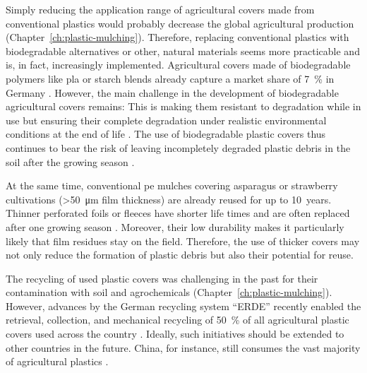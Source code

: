 Simply reducing the application range of agricultural covers made from conventional plastics would probably decrease the global agricultural production (Chapter~\ref{ch:plastic-mulching}). Therefore, replacing conventional plastics with biodegradable alternatives or other, natural materials seems more practicable \citep{BrandesMikro2020} and is, in fact, increasingly implemented. Agricultural covers made of biodegradable polymers like \ac{pla} or starch blends already capture a market share of \SI{7}{\percent} in Germany \citep{BertlingKunststoffe2021}. However, the main challenge in the development of biodegradable agricultural covers remains: This is making them resistant to degradation while in use but ensuring their complete degradation under realistic environmental conditions at the end of life \citep[Chapter~\ref{ch:plastic-mulching};][]{BertlingKunststoffe2021}. The use of biodegradable plastic covers thus continues to bear the risk of leaving incompletely degraded plastic debris in the soil after the growing season \citep{SanderBiodegradation2019,VieraAre2021}.

At the same time, conventional \ac{pe} mulches covering asparagus or strawberry cultivations (\SI{>50}{\micro\meter} film thickness) are already reused for up to \SI{10}{years}. Thinner perforated foils or fleeces have shorter life times and are often replaced after one growing season \citep[Chapter~\ref{ch:screening};][]{BertlingKunststoffe2021}. Moreover, their low durability makes it particularly likely that film residues stay on the field. Therefore, the use of thicker covers may not only reduce the formation of plastic debris but also their potential for reuse.

The recycling of used plastic covers was challenging in the past for their contamination with soil and agrochemicals (Chapter~\ref{ch:plastic-mulching}). However, advances by the German recycling system ``ERDE'' recently enabled the retrieval, collection, and mechanical recycling of \SI{50}{\percent} of all agricultural plastic covers used across the country \citep{BertlingKunststoffe2021,ERDERecyclingERDE2021}. Ideally, such initiatives should be extended to other countries in the future. China, for instance, still consumes the vast majority of agricultural plastics \citep[Chapter~\ref{ch:plastic-mulching};][]{MormileWorld2017}.

